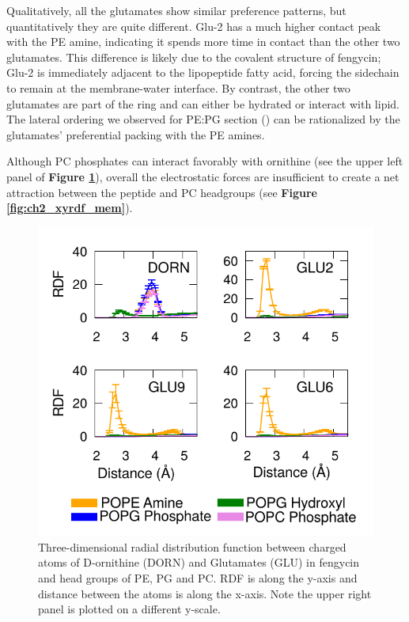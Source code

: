 Qualitatively, all the glutamates show similar preference patterns, but
quantitatively they are quite different. Glu-2 has a much higher contact peak with the PE amine,
indicating it spends more time in contact
than the other two glutamates. This difference is likely
due to the covalent structure of fengycin; Glu-2 is immediately adjacent
to the lipopeptide fatty acid, forcing the sidechain to remain at the
membrane-water interface.  By contrast, the other two glutamates are
part of the ring and can either be hydrated or interact with
lipid. The lateral ordering we observed for PE:PG section (\textbf{}) can be rationalized by the glutamates'
preferential packing with the PE amines.

Although PC phosphates can interact favorably with ornithine (see the upper
left panel of \textbf{Figure \ref{fig:ch2_atomic_rdf}}), overall  the electrostatic forces
are insufficient to create a net attraction between the peptide and PC
headgroups (see \textbf{Figure \ref{fig:ch2_xyrdf_mem}}).

\begin{figure}
\centering
\includegraphics[width=1.0\textwidth]{chapter2_figs/atomic_rdf.pdf}
\caption{\label{fig:ch2_atomic_rdf} Three-dimensional radial distribution function between
charged atoms of D-ornithine (DORN) and Glutamates (GLU) in fengycin and head groups of
PE, PG and PC. RDF is along the y-axis and distance between the atoms is along the x-axis.
Note the upper right panel is plotted on a different y-scale.}
\end{figure}
\newpage

